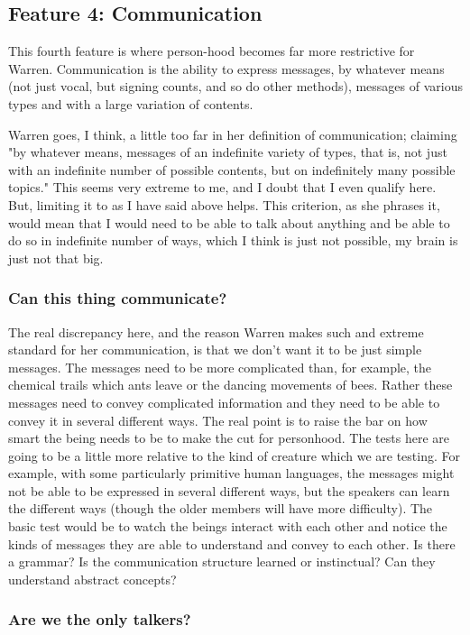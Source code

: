 \subsection{Feature 4: Communication}

This fourth feature is where person-hood becomes far more restrictive for Warren. Communication is the ability to express messages, by whatever means (not just vocal, but signing counts, and so do other methods), messages of various types and with a large variation of contents. 

Warren goes, I think, a little too far in her definition of communication; claiming "by whatever means, messages of an indefinite variety of types, that is, not just with an indefinite number of possible contents, but on indefinitely many possible topics." This seems very extreme to me, and I doubt that I even qualify here. But, limiting it to as I have said above helps. This criterion, as she phrases it, would mean that I would need to be able to talk about anything and  be able to do so in indefinite number of ways, which I think is just not possible, my brain is just not that big.
\subsubsection{Can this thing communicate?}

The real discrepancy here, and the reason Warren makes such and extreme standard for her communication, is that we don't want it to be just simple messages. The messages need to be more complicated than, for example, the chemical trails which ants leave or the dancing movements of bees. Rather these messages need to convey complicated information and they need to be able to convey it in several different ways.  The real point is to raise the bar on how smart the being needs to be to make the cut for personhood. The tests here are going to be a little more relative to the kind of creature which we are testing. For example, with some particularly primitive human languages, the messages might not be able to be expressed in several different ways, but the speakers can learn the different ways (though the older members will have more difficulty). The basic test would be to watch the beings interact with each other and notice the kinds of messages they are able to understand and convey to each other. Is there a grammar? Is the communication structure learned or instinctual? Can they understand abstract concepts?   
\subsubsection{Are we the only talkers?}

